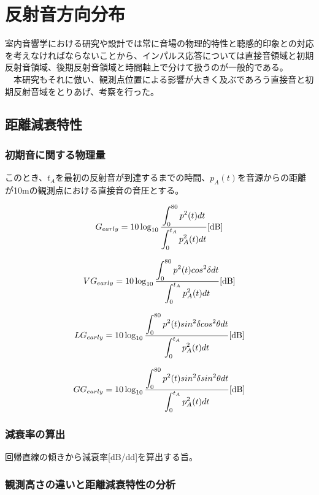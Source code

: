 \chapter{反射音方向分布}
室内音響学における研究や設計では常に音場の物理的特性と聴感的印象との対応を考えなければならないことから、インパルス応答については直接音領域と初期反射音領域、後期反射音領域と時間軸上で分けて扱うのが一般的である。
\\　本研究もそれに倣い、観測点位置による影響が大きく及ぶであろう直接音と初期反射音域をとりあげ、考察を行った。
\section{距離減衰特性}
\subsection{初期音に関する物理量}

このとき、$t_A$を最初の反射音が到達するまでの時間、$p_A(t)$を音源からの距離が10mの観測点における直接音の音圧とする。

\begin{equation}
  \label{eq:}
  G_{early} = 10\log_{10}{\frac{\displaystyle\int_0^{80}p^2(t)dt}{\displaystyle\int_0^{t_A}p_{A}^2(t)dt}} \textrm{[dB]}
\end{equation}

\begin{equation}
  \label{eq:}
  VG_{early} = 10\log_{10}{\frac{\displaystyle\int_0^{80}p^2(t)cos^2{\delta}dt}{\displaystyle\int_0^{t_A}p_{A}^2(t)dt}} \textrm{[dB]}
\end{equation}

\begin{equation}
  \label{eq:}
  LG_{early} = 10\log_{10}{\frac{\displaystyle\int_0^{80}p^2(t)sin^2{\delta}cos^2{\theta}dt}{\displaystyle\int_0^{t_A}p_{A}^2(t)dt}} \textrm{[dB]}
\end{equation}

\begin{equation}
  \label{eq:}
  GG_{early} = 10\log_{10}{\frac{\displaystyle\int_0^{80}p^2(t)sin^2{\delta}sin^2{\theta}dt}{\displaystyle\int_0^{t_A}p_{A}^2(t)dt}} \textrm{[dB]}
\end{equation}

\subsection{減衰率の算出}
回帰直線の傾きから減衰率[dB/dd]を算出する旨。
\subsection{観測高さの違いと距離減衰特性の分析}
